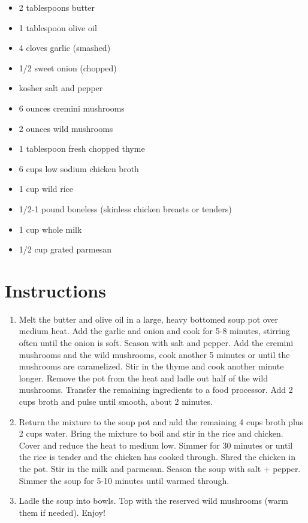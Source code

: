\documentclass[
  letterpaper,
  DIV=11,
  numbers=noendperiod,
  titlepage=false]{scrreprt}
\providecommand{\tightlist}{%
  \setlength{\itemsep}{0pt}\setlength{\parskip}{0pt}}\usepackage{longtable,booktabs,array}
\begin{document}
\begin{itemize}
\tightlist
\item
  2 tablespoons butter
\item
  1 tablespoon olive oil
\item
  4 cloves garlic (smashed)
\item
  1/2 sweet onion (chopped)
\item
  kosher salt and pepper
\item
  6 ounces cremini mushrooms
\item
  2 ounces wild mushrooms
\item
  1 tablespoon fresh chopped thyme
\item
  6 cups low sodium chicken broth
\item
  1 cup wild rice
\item
  1/2-1 pound boneless (skinless chicken breasts or tenders)
\item
  1 cup whole milk
\item
  1/2 cup grated parmesan
\end{itemize}

\section{Instructions}\label{instructions-174}

\begin{enumerate}
\def\labelenumi{\arabic{enumi}.}
\tightlist
\item
  Melt the butter and olive oil in a large, heavy bottomed soup pot over
  medium heat. Add the garlic and onion and cook for 5-8 minutes,
  stirring often until the onion is soft. Season with salt and pepper.
  Add the cremini mushrooms and the wild mushrooms, cook another 5
  minutes or until the mushrooms are caramelized. Stir in the thyme and
  cook another minute longer. Remove the pot from the heat and ladle out
  half of the wild mushrooms. Transfer the remaining ingredients to a
  food processor. Add 2 cups broth and pulse until smooth, about 2
  minutes.
\item
  Return the mixture to the soup pot and add the remaining 4 cups broth
  plus 2 cups water. Bring the mixture to boil and stir in the rice and
  chicken. Cover and reduce the heat to medium low. Simmer for 30
  minutes or until the rice is tender and the chicken has cooked
  through. Shred the chicken in the pot. Stir in the milk and parmesan.
  Season the soup with salt + pepper. Simmer the soup for 5-10 minutes
  until warmed through.
\item
  Ladle the soup into bowls. Top with the reserved wild mushrooms (warm
  them if needed). Enjoy!
\end{enumerate}
\end{document}

